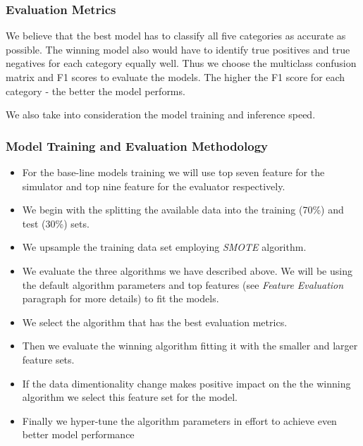 \hypertarget{evaluation-metrics}{%
\subsubsection{Evaluation Metrics}\label{evaluation-metrics}}

We believe that the best model has to classify all five categories as
accurate as possible. The winning model also would have to identify true
positives and true negatives for each category equally well. Thus we
choose the multiclass confusion matrix and F1 scores to evaluate the
models. The higher the F1 score for each category - the better the model
performs.

We also take into consideration the model training and inference speed.

\hypertarget{model-training-and-evaluation-methodology}{%
\subsubsection{Model Training and Evaluation
Methodology}\label{model-training-and-evaluation-methodology}}

\begin{itemize}
\tightlist
\item
  For the base-line models training we will use top seven feature for
  the simulator and top nine feature for the evaluator respectively.
\item
  We begin with the splitting the available data into the training
  (70\%) and test (30\%) sets.
\item
  We upsample the training data set employing \emph{SMOTE} algorithm.
\item
  We evaluate the three algorithms we have described above. We will be
  using the default algorithm parameters and top features (see
  \emph{Feature Evaluation} paragraph for more details) to fit the
  models.
\item
  We select the algorithm that has the best evaluation metrics.
\item
  Then we evaluate the winning algorithm fitting it with the smaller and
  larger feature sets.
\item
  If the data dimentionality change makes positive impact on the the
  winning algorithm we select this feature set for the model.
\item
  Finally we hyper-tune the algorithm parameters in effort to achieve
  even better model performance
\end{itemize}

